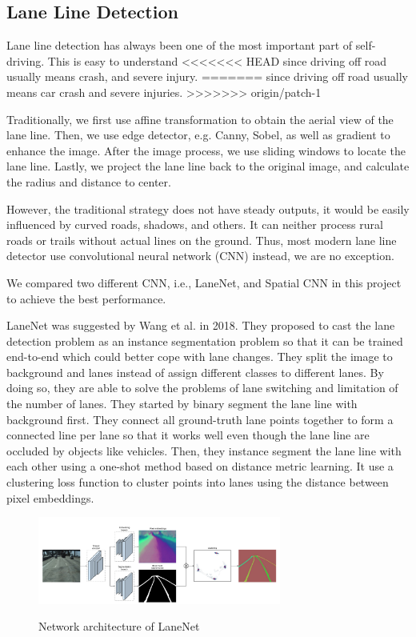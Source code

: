 \documentclass[runningheads]{llncs}
\begin{document}
\subsection{Lane Line Detection}
Lane line detection has always been one of the most 
important part of self-driving. This is easy to understand 
<<<<<<< HEAD
since driving off road usually means crash, and severe 
injury. 
=======
since driving off road usually means car crash and severe 
injuries. 
>>>>>>> origin/patch-1

Traditionally, we first use affine transformation to obtain 
the aerial view of the lane line. Then, we use edge 
detector, e.g. Canny, Sobel, as well as gradient to enhance 
the image. After the image process, we use sliding windows 
to locate the lane line. Lastly, we project the lane line 
back to the original image, and calculate the radius and 
distance to center. 

However, the traditional strategy does not have steady 
outputs, it would be easily influenced by curved roads, 
shadows, and others. It can neither process rural roads or 
trails without actual lines on the ground. Thus, most 
modern lane line detector use convolutional neural network 
(CNN) instead, we are no exception. 

We compared two different CNN, i.e., LaneNet, and 
Spatial CNN in this project to achieve the best performance. 

LaneNet was suggested by Wang et al.\cite{LaneNet} in 2018. 
They proposed to cast the lane detection problem as an 
instance segmentation problem so that it can be trained 
end-to-end which could better cope with lane changes. 
They split the image to background and lanes instead of 
assign different classes to different lanes. By doing so, 
they are able to solve the problems of lane switching and 
limitation of the number of lanes. They started by binary 
segment the lane line with background first. They connect 
all ground-truth lane points together to form a connected 
line per lane so that it works well even though the lane 
line are occluded by objects like vehicles. Then, they 
instance segment the lane line with each other using a 
one-shot method based on distance metric learning. It use a 
clustering loss function to cluster points into lanes using 
the distance between pixel embeddings.
 
\begin{figure}
    \centering
    \includegraphics[width=8cm]{reference/lanenet}
    \label{fig:example}
    \caption{Network architecture of LaneNet}
\end{figure}
\end{document}
